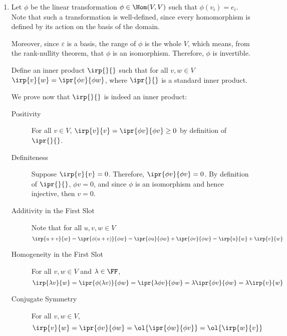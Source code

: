\documentclass[11pt]{scrartcl}
\begin{document}
\begin{enumerate}[label=\alph*)]



\item
Let $\phi$ be the linear transformation $\phi \in \Hom(V,V)$ such that $\phi(v_i)=e_i$. Note that such a transformation is well-defined, since every homomorphism is defined by its action on the basis of the domain.

Moreover, since $\varepsilon$ is a basis, the range of $\phi$ is the whole $V$, which means, from the rank-nullity theorem, that $\phi$ is an isomorphism. Therefore, $\phi$ is invertible.

Define an inner product $\irp{\*}{\*}$ such that for all $v,w\in V$ $\irp{v}{w} = \ipr{\phi v}{\phi w}$, where $\ipr{\*}{\*}$ is a standard inner product.

We prove now that $\irp{\*}{\*}$ is indeed an inner product:


\begin{description}

\item[Positivity]\hfill

  For all $v\in V$, $\irp{v}{v} = \ipr{\phi v}{\phi v} \geq 0$ by definition of $\ipr{\*}{\*}$.
\item[Definiteness] \hfill

  Suppose $\irp{v}{v} = 0$. Therefore, $\ipr{\phi v}{\phi v} = 0$. By definition of $\ipr{\*}{\*}$, $\phi v = 0$, and since $\phi$ is an isomorphism and hence injective, then $v = 0$.
  
\item[Additivity in the First Slot] \hfill

  Note that for all $u,v, w \in V$
  \[
    \irp{u+v}{w} = \ipr{\phi(u+v)}{\phi w} = \ipr{\phi u}{\phi w} + \ipr{\phi v}{\phi w}=\irp{u}{w}+\irp{v}{w}
  \]
  
\item[Homogeneity in the First Slot]\hfill

  For all $v, w\in V$ and $\lambda \in \FF$,
  \[    \irp{\lambda v}{w} = \ipr{\phi(\lambda v)}{\phi w} = \ipr{\lambda \phi v}{\phi w} = \lambda \ipr{\phi v}{\phi w} = \lambda \irp{v}{w}
  \]
  
\item[Conjugate Symmetry] \hfill

  For all $v, w \in V$,
  \[\irp{v}{w} = \ipr{\phi v}{\phi w} = \ol{\ipr{\phi w}{\phi v}} = \ol{\irp{w}{v}}
  \]
  

\end{description}
\end{enumerate}
\end{document}

